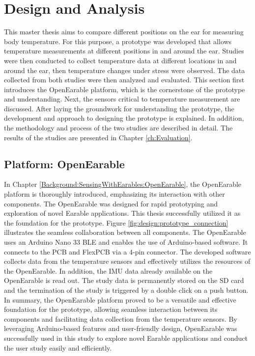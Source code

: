 \chapter{Design and Analysis}
\label{ch:Design}
This master thesis aims to compare different positions on the ear for measuring body temperature. 
For this purpose, a prototype was developed that allows temperature measurements at different positions in and around the ear. 
Studies were then conducted to collect temperature data at different locations in and around the ear, then temperature changes under stress were observed.
The data collected from both studies were then analyzed and evaluated.
This section first introduces the OpenEarable platform, which is the cornerstone of the prototype and understanding. 
Next, the sensors critical to temperature measurement are discussed.
After laying the groundwork for understanding the prototype, the development and approach to designing the prototype is explained.
In addition, the methodology and process of the two studies are described in detail.
The results of the studies are presented in Chapter \ref{ch:Evaluation}.

\section{Platform: OpenEarable}
\label{ch:Design:Prototype:OpenEarable}
In Chapter \ref{Background:SensingWithEarables:OpenEarable}, the OpenEarable platform is thoroughly introduced, emphasizing its interaction with other components. 
The OpenEarable was designed for rapid prototyping and exploration of novel Earable applications.
This thesis successfully utilized it as the foundation for the prototype. 
Figure \ref{fig:design:prototype_connection} illustrates the seamless collaboration between all components. 
The OpenEarable uses an Arduino Nano 33 BLE and enables the use of Arduino-based software. It connects to the PCB and FlexPCB via a 4-pin connector. 
The developed software collects data from the temperature sensors and effectively utilizes the resources of the OpenEarable. 
In addition, the IMU data already available on the OpenEarable is read out.
The study data is permanently stored on the SD card and the termination of the study is triggered by a double click on a push button.
In summary, the OpenEarable platform proved to be a versatile and effective foundation for the prototype, allowing seamless interaction between its components and facilitating data collection from the temperature sensors. 
By leveraging Arduino-based features and user-friendly design, OpenEarable was successfully used in this study to explore novel Earable applications and conduct the user study easily and efficiently.

